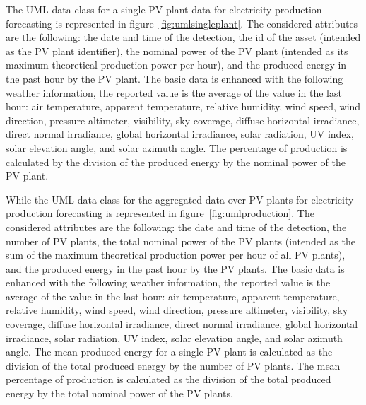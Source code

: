 The UML data class for a single PV plant data for electricity production forecasting is represented in figure~\ref{fig:umlsingleplant}.
The considered attributes are the following: the date and time of the detection, the id of the asset (intended as the PV plant identifier), the nominal power of the PV plant (intended as its maximum theoretical production power per hour), and the produced energy in the past hour by the PV plant.
The basic data is enhanced with the following weather information, the reported value is the average of the value in the last hour: air temperature, apparent temperature, relative humidity, wind speed, wind direction, pressure altimeter, visibility, sky coverage, diffuse horizontal irradiance, direct normal irradiance, global horizontal irradiance, solar radiation, UV index, solar elevation angle, and solar azimuth angle.
The percentage of production is calculated by the division of the produced energy by the nominal power of the PV plant.

While the UML data class for the aggregated data over PV plants for electricity production forecasting is represented in figure~\ref{fig:umlproduction}.
The considered attributes are the following: the date and time of the detection, the number of PV plants, the total nominal power of the PV plants (intended as the sum of the maximum theoretical production power per hour of all PV plants), and the produced energy in the past hour by the PV plants.
The basic data is enhanced with the following weather information, the reported value is the average of the value in the last hour: air temperature, apparent temperature, relative humidity, wind speed, wind direction, pressure altimeter, visibility, sky coverage, diffuse horizontal irradiance, direct normal irradiance, global horizontal irradiance, solar radiation, UV index, solar elevation angle, and solar azimuth angle.
The mean produced energy for a single PV plant is calculated as the division of the total produced energy by the number of PV plants.
The mean percentage of production is calculated as the division of the total produced energy by the total nominal power of the PV plants.


